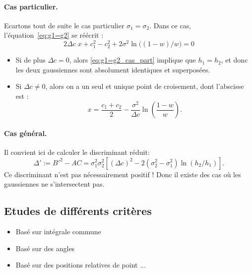 \documentclass[main.tex]{subfiles}
\begin{document}
\paragraph{Cas particulier.}
Ecartons tout de suite le cas particulier $\sigma_1=\sigma_2$. %
Dans ce cas, l'équation~\eqref{eq:g1=g2} se réécrit :
\begin{equation}
\label{eq:g1=g2_cas_part}
2\Delta c \; x + c_1^2-c_2^2 +  2 \sigma^2 \ln \big( (1-w) / w \big) = 0
\end{equation}
\begin{itemize}
\item Si de plus $\Delta c=0$, alors \eqref{eq:g1=g2_cas_part} implique que $h_1=h_2$, et donc les deux gaussiennes sont absolument identiques et superposées.
\item Si $\Delta c\neq0$, alors on a un seul et unique point de croisement, dont l'abscisse est :
\begin{equation}
\label{eq:pt_croisement_unique}
x=\dfrac{c_1+c_2}{2}-\dfrac{\sigma^2}{\Delta c}\ln \left( \dfrac{1-w}{w} \right).
\end{equation}
\end{itemize}
\paragraph{Cas général.} Il convient ici de calculer le discriminant réduit:
\begin{equation}
\label{eq:discr_reduit}
\Delta' := B'^2 - AC = \sigma_1^2 \sigma_2^2 \left[ (\Delta c)^2 - 2(\sigma_2^2-\sigma_1^2) \ln (h_2/h_1)  \right].
\end{equation}
Ce discriminant n'est pas nécessairement positif ! Donc il existe des cas où les gaussiennes ne s'intersectent pas.

\subsection{Etudes de différents critères}
\begin{itemize}
\item Basé sur intégrale commune
\item Basé sur des angles
\item Basé sur des positions relatives de point ...
\end{itemize}
\end{document}
